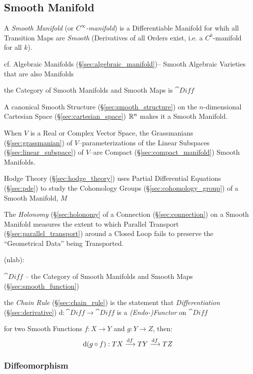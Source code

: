 \subsection{Smooth Manifold}\label{sec:smooth_manifold}

A \emph{Smooth Manifold} (or \emph{$C^\infty$-manifold}) is a Differentiable
Manifold for whih all Transition Maps are \emph{Smooth} (Derivatives of
all Orders exist, i.e. a $C^k$-manifold for all $k$).

\fist cf. Algebraic Manifolds (\S\ref{sec:algebraic_manifold})-- Smooth
Algebraic Varieties that are also Manifolds

the Category of Smooth Manifolds and Smooth Maps is $\cat{Diff}$

A canonical Smooth Structure (\S\ref{sec:smooth_structure}) on the
$n$-dimensional Cartesian Space (\S\ref{sec:cartesian_space}) $\mathbb{R}^n$ makes
it a Smooth Manifold.

When $V$ is a Real or Complex Vector Space, the Grassmanians
(\S\ref{sec:grassmanian}) of $V$--parameterizations of the Linear Subspaces
(\S\ref{sec:linear_subspace}) of $V$--are Compact (\S\ref{sec:compact_manifold})
Smooth Manifolds.

\fist Hodge Theory (\S\ref{sec:hodge_theory}) uses Partial Differential
Equations (\S\ref{sec:pde}) to study the Cohomology Groups
(\S\ref{sec:cohomology_group}) of a Smooth Manifold, $M$

\fist The \emph{Holonomy} (\S\ref{sec:holonomy} of a Connection
(\S\ref{sec:connection}) on a Smooth Manifold measures the extent to which
Parallel Transport (\S\ref{sec:parallel_transport}) around a Closed Loop fails
to preserve the ``Geometrical Data'' being Transported.

(nlab):

$\cat{Diff}$ -- the Category of Smooth Manifolds and Smooth Maps
(\S\ref{sec:smooth_function})

the \emph{Chain Rule} (\S\ref{sec:chain_rule}) is the statement that
\emph{Differentiation} (\S\ref{sec:derivative}) $\mathrm{d} : \cat{Diff}
\rightarrow \cat{Diff}$ is a \emph{(Endo-)Functor} on $\cat{Diff}$

for two Smooth Functions $f : X \rightarrow Y$ and $g : Y \rightarrow Z$, then:
\[
  \mathrm{d}(g \circ f) : TX \xrightarrow{\mathrm{d}f} TY \xrightarrow{\mathrm{d}f} TZ
\]



\subsubsection{Diffeomorphism}\label{sec:diffeomorphism}

